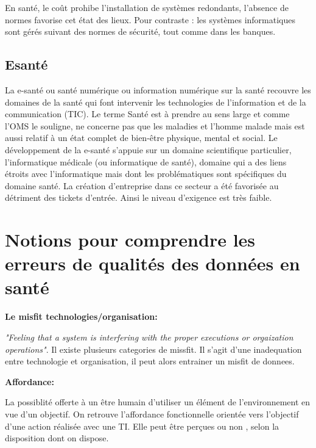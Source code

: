 \documentclass[12pt]{article}
\begin{document}
En santé, le coût prohibe l'installation de systèmes redondants, l'absence de normes favorise cet état des lieux. Pour contraste : les systèmes informatiques sont gérés suivant des normes de sécurité, tout comme dans les banques.

\subsection{Esanté}
La e-santé ou santé numérique ou information numérique sur la santé recouvre les domaines de la santé qui font intervenir les technologies de l'information et de la communication (TIC). Le terme Santé est à prendre au sens large et comme l’OMS le souligne, ne concerne pas que les maladies et l’homme malade mais est aussi relatif à un état complet de bien-être physique, mental et social. Le développement de la e-santé s'appuie sur un domaine scientifique particulier, l'informatique médicale (ou informatique de santé), domaine qui a des liens étroits avec l’informatique mais dont les problématiques sont spécifiques du domaine santé. 
La création d'entreprise dans ce secteur a été favorisée au détriment des tickets d'entrée. Ainsi le niveau d'exigence est très faible.

\section{Notions pour comprendre les erreurs de qualités des données en santé}
\textbf {Le misfit technologies/organisation:} \\
\begin{minipage}{0.8\textwidth}
\textit{"Feeling that a system is interfering with the proper executions or orgaization operations"}. Il existe plusieurs categories de missfit. Il s'agit d'une inadequation entre technologie et organisation, il peut alors entrainer un misfit de donnees.\\
\end{minipage}

\textbf{Affordance:}

\begin{minipage}{0.8\textwidth}
La possiblité offerte à un être humain d'utiliser un élément de l'environnement en vue d'un objectif. On retrouve l'affordance fonctionnelle orientée vers l'objectif d'une action réalisée avec une TI. Elle peut être perçues ou non , selon la disposition dont on dispose.\\
\end{minipage}
\end{document}
